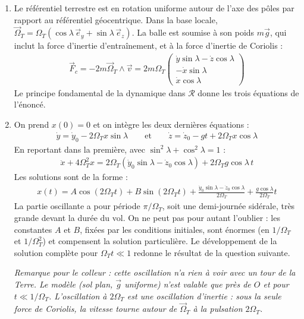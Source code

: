 \begin{correction}

\begin{enumerate}

	\item Le référentiel terrestre est en rotation uniforme autour de l'axe des pôles par rapport au référentiel géocentrique. Dans la base locale, $\vec{\Omega}_T=\Omega_T\left(\cos\lambda\,\vec{e}_y+\sin\lambda\,\vec{e}_z\right)$. La balle est soumise à son poids $m\vec{g}$, qui inclut la force d'inertie d'entraînement, et à la force d'inertie de Coriolis :
	\begin{align*}
		\vec{F}_c=-2m\vec{\Omega}_T\wedge\vec{v}=2m\Omega_T\begin{pmatrix} \dot{y}\sin\lambda-\dot{z}\cos\lambda\\ -\dot{x}\sin\lambda \\ \dot{x}\cos\lambda \end{pmatrix}
	\end{align*}
	Le principe fondamental de la dynamique dans $\mathcal{R}$ donne les trois équations de l'énoncé.

	\item On prend $x(0)=0$ et on intègre les deux dernières équations :
	\begin{align*}
		\dot{y}=\dot{y}_0-2\Omega_Tx\sin\lambda \qquad\text{et}\qquad \dot{z}=\dot{z}_0-gt+2\Omega_Tx\cos\lambda
	\end{align*}
	En reportant dans la première, avec $\sin^2\lambda+\cos^2\lambda=1$ :
	\begin{align*}
		\boxed{\ddot{x}+4\Omega_T^2x=2\Omega_T\left(\dot{y}_0\sin\lambda-\dot{z}_0\cos\lambda\right)+2\Omega_Tg\cos\lambda\,t}
	\end{align*}
	Les solutions sont de la forme :
	\begin{align*}
		x(t)=A\cos(2\Omega_Tt)+B\sin(2\Omega_Tt)+\frac{\dot{y}_0\sin\lambda-\dot{z}_0\cos\lambda}{2\Omega_T}+\frac{g\cos\lambda}{2\Omega_T}t
	\end{align*}
	La partie oscillante a pour période $\pi/\Omega_T$, soit une demi-journée sidérale, très grande devant la durée du vol. On ne peut pas pour autant l'oublier : les constantes $A$ et $B$, fixées par les conditions initiales, sont énormes (en $1/\Omega_T$ et $1/\Omega_T^2$) et compensent la solution particulière. Le développement de la solution complète pour $\Omega_Tt\ll1$ redonne le résultat de la question suivante.

	\textit{Remarque pour le colleur : cette oscillation n'a rien à voir avec un tour de la Terre. Le modèle (sol plan, $\vec{g}$ uniforme) n'est valable que près de $O$ et pour $t\ll1/\Omega_T$. L'oscillation à $2\Omega_T$ est une oscillation d'inertie : sous la seule force de Coriolis, la vitesse tourne autour de $\vec{\Omega}_T$ à la pulsation $2\Omega_T$.}


\end{enumerate}
\end{correction}
